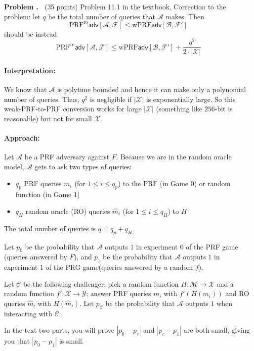 \documentclass[12pt]{article}
\theoremstyle{definition}
\newcommand{\addbigskip}{\addvspace{\bigskipamount}}
\newcounter{problemnum}
\newenvironment{problem}
     {\addbigskip \setcounter{partnum}{0}
      \noindent\stepcounter{problemnum}\textbf{Problem
                                             \arabic{problemnum}.\ }}
     {\par\addbigskip}
\newcounter{partnum}
\newcommand{\X}{\mathcal{X}}
\newcommand{\Y}{\mathcal{Y}}
\newcommand{\M}{\mathcal{M}}
\newcommand{\C}{\mathcal{C}}
\newcommand{\Adv}{\mathcal{A}}
\begin{document}
\begin{problem} (35 points)
Problem 11.1 in the textbook. Correction to the problem: let $q$ be the total number of queries that $\Adv$ makes. Then
$$\mathrm{PRF}^{\mathrm{ro}}\mathsf{adv}[\mathcal{A}, \mathcal{F} ] \le \mathrm{wPRF}\mathsf{adv}[\mathcal{B}, \mathcal{F'}]$$
should be instead
$$\mathrm{PRF}^{\mathrm{ro}}\mathsf{adv}[\mathcal{A}, \mathcal{F} ] \le \mathrm{wPRF}\mathsf{adv}[\mathcal{B}, \mathcal{F'}]+\frac{q^2}{2\cdot |\mathcal{X}|}$$

\paragraph{Interpretation:} We know that $\Adv$ is polytime bounded and hence it can make only a polynomial number of queries. Thus, $q^2$ is negligible if $|\mathcal{X}|$ is exponentially large. So this weak-PRF-to-PRF conversion works for large $|\mathcal{X}|$ (something like $256$-bit is reasonable) but not for small $\mathcal{X}$. 


\paragraph{Approach:}
	Let $\Adv$ be a PRF adversary against $F$. Because we are in the random oracle model, $\Adv$ gets to ask two types of queries: 
\begin{itemize}
	\item $q_p$ PRF queries $m_i$ (for $1\le i \le q_p$) to the PRF (in Game 0) or random function (in Game 1)
	\item $q_H$ random oracle (RO) queries $\hat{m}_i$ (for $1\le i\le q_H$) to $H$	
\end{itemize}
The total number of queries is $q=q_p+q_H$.
	
	Let $p_0$ be the probability that $\Adv$ outputs $1$ in experiment 0 of the PRF game (queries answered by $F$), and $p_1$ be the probability that $\Adv$ outputs $1$ in experiment 1 of the PRG game(queries answered by a random $f$). 
	
	Let $\C$ be the following challenger: pick a random function $H: \M \to\X$ and a random function $f':\X\to \Y$;	answer PRF queries $m_i$ with $f'(H(m_i))$ and RO queries $\hat{m}_i$ with $H(\hat{m}_i)$. Let $p_\C$ be the probability that $\Adv$ outputs $1$ when interacting with $\C$. 
	
	In the text two parts, you will prove $|p_0-p_c|$ and $|p_c-p_1|$ are both small, giving you that $|p_0-p_1|$ is small.


\end{problem}
\end{document}
